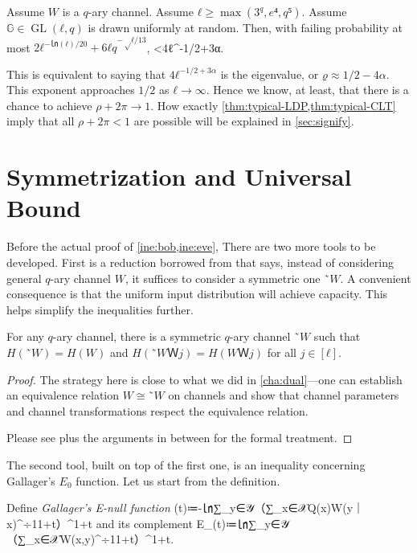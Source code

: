 \documentclass[openany]{amsbook}
\numberwithin{equation}{chapter}
\numberwithin{figure}{chapter}
\numberwithin{table}{chapter}
\def\Eo{E_\mathrm 0}
\DeclareMathOperator\GL{GL}
\def\[#1\]{\begin{equation*}{#1}\end{equation*}}
\theoremstyle{definition}	理dfn:Definition~?s			理exa:Example~?s
\theoremstyle{remark}		理cla:Claim~?s				理rem:Remark~?s
\begin{document}
	\begin{thm}\label{thm:typical-CLT}
		Assume $W$ is a $q$-ary channel.
		Assume $ℓ≥\max(3^q,e⁴,q⁵)$.
		Assume $𝔾∈\GL(ℓ,q)$ is drawn uniformly at random.
		Then, with failing probability at most $2ℓ^{-㏑(ℓ)/20}+6ℓq^{-√ℓ/13}$,
		\[÷{h(H(WＷ1))+h(H(WＷ2))+\dotsb+h(H(WＷ{ℓ}))}{ℓh(H(W))}<4ℓ^{-1/2+3α}.\]
	\end{thm}
	
	This is equivalent to saying that $4ℓ^{-1/2+3α}$ is the eigenvalue, or $ϱ≈1/2-4α$.
	This exponent approaches $1/2$ as $ℓ→∞$.
	Hence we know, at least, that there is a chance to achieve $ρ+2π→1$.
	How exactly \cref{thm:typical-LDP,thm:typical-CLT} imply that all $ρ+2π<1$
	are possible will be explained in \cref{sec:signify}.

\section{Symmetrization and Universal Bound} \label{sec:prepare}

	Before the actual proof of \cref{ine:bob,ine:eve},
	There are two more tools to be developed.
	First is a reduction borrowed from \cite{MT14} that says, instead of considering
	general $q$-ary channel $W$, it suffices to consider a symmetric one $˜W$.
	A convenient consequence is that
	the uniform input distribution will achieve capacity.
	This helps simplify the inequalities further.
	
	\begin{lem}[Symmetrization]
		For any $q$-ary channel, there is a symmetric $q$-ary channel $˜W$ such that
		$H(˜W)=H(W)$ and $H(˜WＷj)=H(WＷj)$ for all $j∈[ℓ]$.
	\end{lem}
	
	\begin{proof}
		The strategy here is close to what we did in \cref{cha:dual}---one can establish
		an equivalence relation $W≅˜W$ on channels and show that channel parameters
		and channel transformations respect the equivalence relation.
		
		Please see \cite[Definition~6 and Lemmas 7 and~8]{MT14}
		plus the arguments in between for the formal treatment.
	\end{proof}
	
	The second tool, built on top of the first one, is an inequality
	concerning Gallager's $\Eo$ function.
	Let us start from the definition.
	
	\begin{dfn}
		Define \emph{Gallager's E-null function}
		\[\Eo(t)≔-㏑∑_{y∈𝒴}（∑_{x∈𝒳}Q(x)W(y｜x)^÷1{1+t}）^{1+t}\]
		and its complement
		\[¯\Eo(t)≔㏑∑_{y∈𝒴}（∑_{x∈𝒳}W(x,y)^÷1{1+t}）^{1+t}.\]
	\end{dfn}
	
\end{document}
